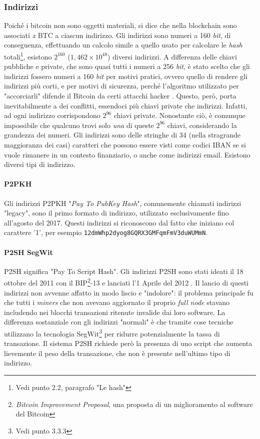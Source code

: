 \documentclass {article}
\begin{document}
\subsubsection {Indirizzi}


Poiché i bitcoin non sono oggetti materiali, si dice che nella blockchain sono associati \textit{x} BTC a ciascun indirizzo.
Gli indirizzi sono numeri a 160 \textit{bit}, di conseguenza, effettuando un calcolo simile a quello usato per calcolare le \textit{hash} totali\footnote{Vedi punto 2.2, paragrafo "Le hash"}, esistono $2^{160}$ ($1,462 \times 10^{48}$) diversi indirizzi.
A differenza delle chiavi pubbliche e private, che sono quasi tutti i numeri a 256 \textit{bit}, è stato scelto che gli indirizzi fossero numeri a 160 \textit{bit} per motivi pratici, ovvero quello di rendere gli indirizzi più corti, e per motivi di sicurezza, perché l'algoritmo utilizzato per "accorciarli" difende il Bitcoin da certi attacchi hacker \cite{160address}.
Questo, però, porta inevitabilmente a dei conflitti, essendoci più chiavi private che indirizzi.
Infatti, ad ogni indirizzo corrispondono $2^{96}$ chiavi private.
Nonostante ciò, è comunque impossibile che qualcuno trovi solo \emph{una} di queste $2^{96}$ chiavi, considerando la grandezza dei numeri.
Gli indirizzi sono delle stringhe di 34 (nella stragrande maggioranza dei casi) caratteri che possono essere visti come codici IBAN se si vuole rimanere in un contesto finanziario, o anche come indirizzi email.
Esistono diversi tipi di indirizzo.

\paragraph {P2PKH}

Gli indirizzi P2PKH "\textit{Pay To PubKey Hash}", comunemente chiamati indirizzi "legacy", sono il primo formato di indirizzo, utilizzato esclusivamente fino all'agosto del 2017.
Questi indirizzi si riconoscono dal fatto che iniziano col carattere '1', per esempio \texttt{12dmWhp2dyog8GQRX3GMFqmFmV3duWUMmN}.

\paragraph {P2SH SegWit}

P2SH significa "Pay To Script Hash".
Gli indirizzi P2SH sono stati ideati il 18 ottobre del 2011 con il BIP\footnote{\textit{Bitcoin Improvement Proposal}, una proposta di un miglioramento al software del Bitcoin}-13 e lanciati l'1 Aprile del 2012 \cite{bip13}\cite{p2sh}.
Il lancio di questi indirizzi non avvenne affatto in modo liscio e "indolore": il problema principale fu che tutti i \textit{miners} che non avevano aggiornato il proprio \textit{full node} stavano includendo nei blocchi transazioni ritenute invalide dai loro software.
La differenza sostanziale con gli indirizzi "normali" è che tramite cose tecniche utilizzano la tecnologia SegWit\footnote{Vedi punto 3.3.3} per ridurre potenzialmente la tassa di transazione.
Il sistema P2SH richiede però la presenza di uno script che aumenta lievemente il peso della transazione, che non è presente nell'ultimo tipo di indirizzo.
\end{document}
